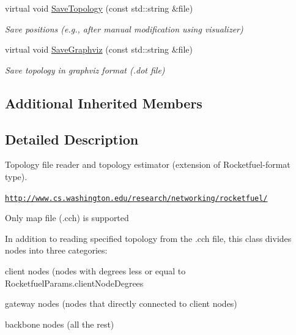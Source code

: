 \begin{DoxyCompactItemize}
\item 
virtual void \hyperlink{classns3_1_1RocketfuelMapReader_aa96e05a95a37d8e209b292b427de32cc}{Save\+Topology} (const std\+::string \&file)\hypertarget{classns3_1_1RocketfuelMapReader_aa96e05a95a37d8e209b292b427de32cc}{}\label{classns3_1_1RocketfuelMapReader_aa96e05a95a37d8e209b292b427de32cc}

\begin{DoxyCompactList}\small\item\em Save positions (e.\+g., after manual modification using visualizer) \end{DoxyCompactList}\item 
virtual void \hyperlink{classns3_1_1RocketfuelMapReader_a9cd59a307707a53add1717ce2535f996}{Save\+Graphviz} (const std\+::string \&file)\hypertarget{classns3_1_1RocketfuelMapReader_a9cd59a307707a53add1717ce2535f996}{}\label{classns3_1_1RocketfuelMapReader_a9cd59a307707a53add1717ce2535f996}

\begin{DoxyCompactList}\small\item\em Save topology in graphviz format (.dot file) \end{DoxyCompactList}\end{DoxyCompactItemize}
\subsection*{Additional Inherited Members}


\subsection{Detailed Description}
Topology file reader and topology estimator (extension of Rocketfuel-\/format type). 

\href{http://www.cs.washington.edu/research/networking/rocketfuel/}{\tt http\+://www.\+cs.\+washington.\+edu/research/networking/rocketfuel/}

Only map file (.cch) is supported

In addition to reading specified topology from the .cch file, this class divides nodes into three categories\+:
\begin{DoxyItemize}
\item client nodes (nodes with degrees less or equal to Rocketfuel\+Params.\+client\+Node\+Degrees
\item gateway nodes (nodes that directly connected to client nodes)
\item backbone nodes (all the rest)
\end{DoxyItemize}

